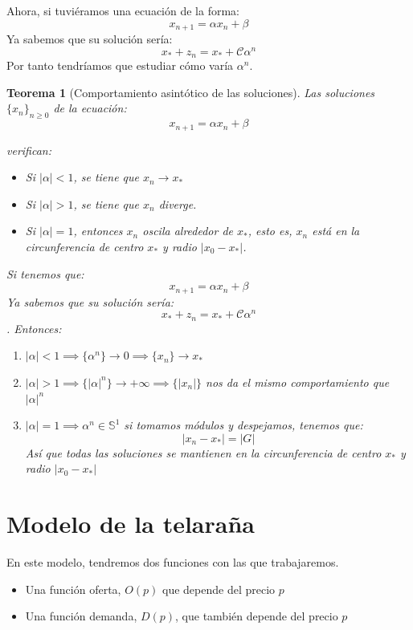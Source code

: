 \documentclass[11pt, a4paper, titlepage]{article}
\makeatletter
\renewenvironment{proof}[1][\proofname] {\vspace{-15pt}\par\pushQED{\qed}\normalfont\topsep6\p@\@plus6\p@\relax\trivlist\item[\hskip\labelsep\it#1\@addpunct{.}]\ignorespaces}{\popQED\endtrivlist\@endpefalse}
\theoremstyle{theorem-style}
\newtheorem*{nth}{Teorema}
\theoremstyle{definition-style}
\theoremstyle{remark-style}
\theoremstyle{example-style}
\newenvironment{nlist}
{\begin{enumerate}
\renewcommand\labelenumi{(\emph{\roman{enumi})}}}
{\end{enumerate}}
\makeatother
\begin{document}
Ahora, si tuviéramos una ecuación de la forma:
\[
x_{n+1}= \alpha x_n + \beta
\]
Ya sabemos que su solución sería:
\[
x_* +z_n = x_* + \mathcal{C}\alpha^n
\]
Por tanto tendríamos que estudiar cómo varía $\alpha^n$.


\begin{nth}[Comportamiento asintótico de las soluciones]
	Las soluciones $\{x_n\}_{n\geq0}$ de la ecuación:
\[
x_{n+1} = \alpha x_n + \beta
\]

verifican:

\begin{itemize}
\item Si $|\alpha| < 1$, se tiene que ${x_n} \to x_*$
\item Si $|\alpha| > 1$, se tiene que ${x_n}$ diverge.
\item Si $|\alpha| = 1$, entonces ${x_n}$ oscila alrededor de $x_*$, esto es, $x_n$ está en la circunferencia de centro $x_*$ y radio $|x_0 - x_*|$.
\end{itemize}\vspace{0.5cm}

	\begin{proof}
	Si tenemos que:
	\[
x_{n+1}= \alpha x_n + \beta
\]
Ya sabemos que su solución sería:
\[
x_* +z_n = x_* + \mathcal{C}\alpha^n
\]. Entonces:
\begin{nlist}
	\item $|\alpha|< 1 \implies \{\alpha^n\}\to 0 \implies \{x_n\} \to x_*$
	\item $|\alpha|> 1 \implies \{|\alpha|^n\}\to +\infty \implies \{|x_n|\}$ nos da el mismo comportamiento que $|\alpha|^n$
	\item $|\alpha| = 1 \implies \alpha^n \in \mathbb{S}^1$ si tomamos módulos y despejamos, tenemos que:
	\[
	|x_n -x_*| = |G|
	\]
	Así que todas las soluciones se mantienen en la circunferencia de centro $x_*$ y radio $|x_0-x_*|$
\end{nlist}
\end{proof}
\end{nth}

\section{Modelo de la telaraña}
En este modelo, tendremos dos funciones con las que trabajaremos. 
\begin{itemize}
	\item Una función oferta, $O(p)$ que depende del precio $p$
	\item Una función demanda, $D(p)$, que también depende del precio $p$
\end{itemize}
\end{document}
